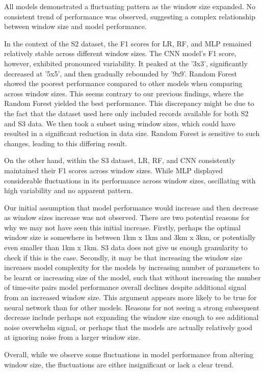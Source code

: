 \documentclass[a4paper,11pt]{report}
\begin{document}
All models demonstrated a fluctuating pattern as the window size expanded. No consistent trend of performance was observed, suggesting a complex relationship between window size and model performance. 

In the context of the S2 dataset, the F1 scores for LR, RF, and MLP remained relatively stable across different window sizes. The CNN model's F1 score, however, exhibited pronounced variability. It peaked at the '3x3', significantly decreased at '5x5', and then gradually rebounded by '9x9'. Random Forest showed the poorest performance compared to other models when comparing across window sizes. This seems contrary to our previous findings, where the Random Forest yielded the best performance. This discrepancy might be due to the fact that the dataset used here only included records available for both S2 and S3 data. We then took a subset using window sizes, which could have resulted in a significant reduction in data size. Random Forest is sensitive to such changes, leading to this differing result.

 On the other hand, within the S3 dataset, LR, RF, and CNN consistently maintained their F1 scores across window sizes. While MLP displayed considerable fluctuations in its performance across window sizes, oscillating with high variability and no apparent pattern. 


Our initial assumption that model performance would increase and then decrease as window sizes increase was not observed. There are two potential reasons for why we may not have seen this initial increase. Firstly, perhaps the optimal window size is somewhere in between 1km x 1km and 3km x 3km, or potentially even smaller than 1km x 1km. S3 data does not give us enough granularity to check if this is the case. Secondly, it may be that increasing the window size increases model complexity for the models by increasing number of parameters to be learnt or increasing size of the model, such that without increasing the number of time-site pairs model performance overall declines despite additional signal from an increased window size. This argument appears more likely to be true for neural network than for other models. Reasons for not seeing a strong subsequent decrease include perhaps not expanding the window size enough to see additional noise overwhelm signal, or perhaps that the models are actually relatively good at ignoring noise from a larger window size. 

Overall, while we observe some fluctuations in model performance from altering window size, the fluctuations are either insignificant or lack a clear trend. 
\end{document}
